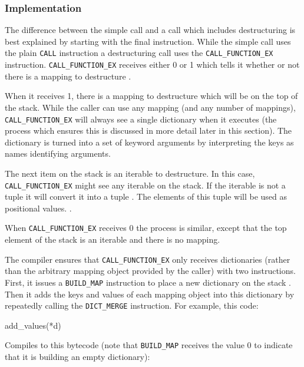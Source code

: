 \subsubsection{Implementation}
The difference between the simple call and a call which includes destructuring is best
explained by starting with the final instruction.
While the simple call uses the plain \texttt{CALL} instruction a destructuring call uses
the \texttt{CALL\_FUNCTION\_EX} instruction.
\texttt{CALL\_FUNCTION\_EX} receives either 0 or 1 which tells it whether or not there is
a mapping to destructure
\parencite[][Doc/library/dis.rst lines 1398-1410]{python-source}.

When it receives 1, there is a mapping to destructure which will be on the top of the
stack.
While the caller can use any mapping (and any number of mappings), 
\texttt{CALL\_FUNCTION\_EX} will always see a single dictionary when it executes (the
process which ensures this is discussed in more detail later in this section).
The dictionary is turned into a set of keyword arguments by interpreting the keys as names
identifying arguments.
\parencite[][Objects/call.c lines 1029-1053]{python-source}

The next item on the stack is an iterable to destructure.
In this case, \texttt{CALL\_FUNCTION\_EX} might see any iterable on the stack.
If the iterable is not a tuple it will convert it into a tuple
\parencite[][Python/bytecodes.c lines 3198-3207]{python-source}.
The elements of this tuple will be used as positional values.
\parencite[][Python/bytecodes.c line 3219]{python-source}.

When \texttt{CALL\_FUNCTION\_EX} receives 0 the process is similar, except that the top
element of the stack is an iterable and there is no mapping.

The compiler ensures that \texttt{CALL\_FUNCTION\_EX} only receives dictionaries (rather
than the arbitrary mapping object provided by the caller) with two instructions.
First, it issues a \texttt{BUILD\_MAP} instruction to place a new dictionary on the stack
\parencite[][Doc/library/dis.rst lines 1015-1023]{python-source}.
Then it adds the keys and values of each mapping object into this dictionary by repeatedly
calling the \texttt{DICT\_MERGE} instruction.
For example, this code:

\begin{pygmented}[lang=python]
add_values(*d)
\end{pygmented}

Compiles to this bytecode (note that \texttt{BUILD\_MAP} receives the value 0 to indicate
that it is building an empty dictionary):

